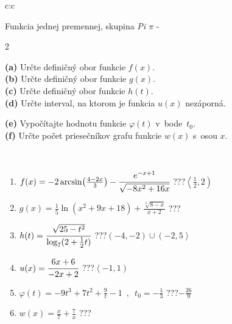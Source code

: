 \documentclass[10pt]{report}
\begin{document}
\begin{tabular}{c:c}
\begin{minipage}[c][104.5mm][t]{0.5\linewidth}
\begin{center}
{\huge Funkcia jednej premennej, skupina \textit{Pi $\pi$} -}\\[5mm]
\begin{minipage}{0.95\linewidth}
\begin{center}
{\small \begin{multicols}{2} \raggedright
\textbf{(a)} Určte definičný obor funkcie \(f(x)\). \\[1mm]
\textbf{(b)} Určte definičný obor funkcie \(g(x)\). \\[1mm]
\textbf{(c)} Určte definičný obor funkcie \(h(t)\). \\[1mm]
\textbf{(d)} Určte interval, na ktorom je funkcia \(u(x)\) nezáporná. \par \columnbreak
\textbf{(e)} Vypočítajte hodnotu funkcie \(\varphi(t)\) v~bode~\(t_0\). \\[1mm]
\textbf{(f)} Určte počet priesečníkov grafu funkcie \(w(x)\) s~osou \(x\). \\[1mm]
\end{multicols}
}
\end{center}
\end{minipage}
\\[4mm]
\begin{minipage}{0.79\linewidth}
\begin{center}
\begin{varwidth}{\linewidth}
\begin{enumerate}
\small
\item $f(x) = -2\arcsin\!\left( \frac{4-2x}{3} \right) - \cfrac{e^{-x+1}}{\sqrt{-8x^2+16x}}$\quad \dotfill\; ???\;\dotfill \quad $\left\langle\frac{1}{2} , 2\right)$
\item $g(x) = \frac{1}{5} \ln{\!(x^2+9x+18)}+\frac{\sqrt[3]{8-x}}{x+2}$\quad \dotfill\; ???\;\dotfill {}
\item $h(t) = \cfrac{\sqrt{25-t^2}}{\log_7(2+\frac{1}{2}t)}$\quad \dotfill\; ???\;\dotfill \quad $\left(-4 , -2\right)\cup\left(-2 , 5\right\rangle$
\item $u(x) = \cfrac{6x+6}{-2x+2}$\quad \dotfill\; ???\;\dotfill \quad $\left\langle-1 , 1\right)$
\item $\varphi(t) = -9t^3+7t^2+\frac{9}{t}-1 \enspace , \enspace t_0=-\frac{1}{3}$\quad \dotfill\; ???\;\dotfill \quad $-\frac{26}{9}$
\item $w(x) = \frac{x}{7}+\frac{7}{x}$\quad \dotfill\; ???\;\dotfill {}
\end{enumerate}

\end{varwidth}
\end{center}
\end{minipage}
\end{center}
\end{minipage}
\end{tabular}
\end{document}

